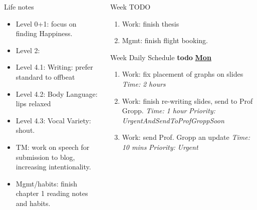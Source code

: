 \documentclass[serif, mathserif, final]{beamer}
\newcommand{\timeEst}[1]{\textit{Time:} \textit{#1}}
\newcommand{\priority}[1]{\textit{Priority:} \textit{#1}}
\begin{document}
\begin{frame}{}
\begin{columns}
\begin{column}{0.25\linewidth}
  \begin{block} {Life notes} 
    \begin{itemize} 
      \tiny \item \tiny Level 0+1: focus on finding Happiness. 
    \item \tiny Level 2: 
    \item \tiny Level 4.1: Writing: prefer standard to offbeat 
    \item \tiny Level 4.2: Body Language: lips relaxed
    \item \tiny Level 4.3: Vocal Variety: shout. 
    \item \tiny TM: work on speech for submission to blog, increasing intentionality. 
    \item \tiny Mgmt/habits: finish chapter 1 reading notes and habits. 
    \end{itemize}     
  \end{block} 
\end{column} %


\begin{column}{0.50\linewidth}
  
  \begin{block}{Week TODO} 
    \begin{enumerate} 
    \item Work: finish thesis 
    \item Mgmt: finish flight booking. 
    \end{enumerate}
  \end{block} 
  
  
\begin{block}{Week Daily Schedule} 
\textbf{todo} 
  \textbf{\small \underline{Mon}}
  \begin{enumerate} 
   \item \tiny Work: fix placement of graphs on slides \timeEst{2 hours} 
   \item \tiny Work: finish re-writing slides, send to Prof Gropp. \timeEst{1 hour} \priority{UrgentAndSendToProfGroppSoon} 
   \item \tiny Work: send Prof. Gropp an update \timeEst{10 mins} \priority{Urgent} 


\end{enumerate}
\end{block}
\end{column}
\end{columns}
\end{frame}
\end{document}
